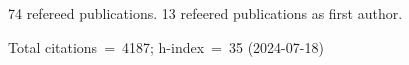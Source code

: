 74 refereed publications. 13 refeered publications as first author.

Total citations~=~4187; h-index~=~35 (2024-07-18)